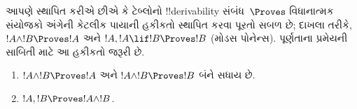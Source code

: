 \documentclass[../../../include/open-logic-section]{subfiles}
\begin{document}
      {}
      {}


\begin{explain}
  આપણે સ્થાપિત કરીએ છીએ કે ટેબ્લોનો !!{derivability} સંબંધ~$\Proves$
  વિધાનાત્મક સંયોજકો અંગેની કેટલીક પાયાની હકીકતો સ્થાપિત કરવા પૂરતો
  સબળ છે; દાખલા તરીકે, $!A \land !B \Proves !A$ અને
  $!A, !A \lif !B \Proves !B$ (મોડસ પોનેન્સ). પૂર્ણતાના પ્રમેયની
  સાબિતી માટે આ હકીકતો જરૂરી છે.
\end{explain}

\begin{prop}
  \begin{enumerate}
  \item {} $!A \land !B \Proves !A$
    અને $!A \land !B \Proves !B$ બંને સધાય છે.
  \item {} $!A, !B \Proves !A \land !B$.
  \end{enumerate}
\end{prop}
\end{document}

